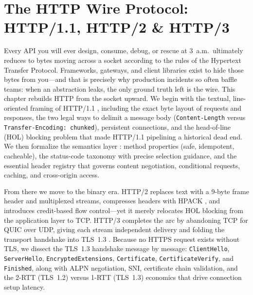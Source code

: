 \chapter{The HTTP Wire Protocol: HTTP/1.1, HTTP/2 \& HTTP/3}
\label{ch:http_wire}

Every API you will ever design, consume, debug, or rescue at 3~a.m.\ ultimately reduces to bytes moving across a socket according to the rules of the Hypertext Transfer Protocol. Frameworks, gateways, and client libraries exist to hide those bytes from you---and that is precisely why production incidents so often baffle teams: when an abstraction leaks, the only ground truth left is the wire. This chapter rebuilds HTTP from the socket upward. We begin with the textual, line-oriented framing of HTTP/1.1 \cite{rfc9112}, including the exact byte layout of requests and responses, the two legal ways to delimit a message body (\texttt{Content-Length} versus \texttt{Transfer-Encoding: chunked}), persistent connections, and the head-of-line (HOL) blocking problem that made HTTP/1.1 pipelining a historical dead end. We then formalize the semantics layer \cite{rfc9110}: method properties (safe, idempotent, cacheable), the status-code taxonomy with precise selection guidance, and the essential header registry that governs content negotiation, conditional requests, caching, and cross-origin access.

From there we move to the binary era. HTTP/2 \cite{rfc9113} replaces text with a 9-byte frame header and multiplexed streams, compresses headers with HPACK \cite{rfc7541}, and introduces credit-based flow control---yet it merely relocates HOL blocking from the application layer to TCP. HTTP/3 \cite{rfc9114} completes the arc by abandoning TCP for QUIC \cite{rfc9000} over UDP, giving each stream independent delivery and folding the transport handshake into TLS~1.3 \cite{rfc8446}. Because no HTTPS request exists without TLS, we dissect the TLS~1.3 handshake message by message: \texttt{ClientHello}, \texttt{ServerHello}, \texttt{EncryptedExtensions}, \texttt{Certificate}, \texttt{CertificateVerify}, and \texttt{Finished}, along with ALPN negotiation, SNI, certificate chain validation, and the 2-RTT (TLS~1.2) versus 1-RTT (TLS~1.3) economics that drive connection setup latency.

